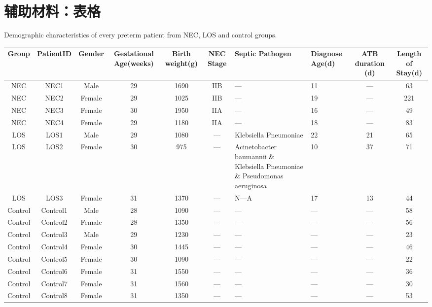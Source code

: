 \chapter{辅助材料：表格}
\label{app:table}
\begin{sidewaystable}[h]
  \tiny
{}
  {Demographic characteristics of every preterm patient from NEC, LOS and control groups.}%
\centering %
\begin{tabular}{ccccccp{2cm}p{2cm}cc} %
\hline\hline %
Group & PatientID & Gender& Gestational Age(weeks) & Birth weight(g) & NEC Stage & Septic Pathogen & Diagnose Age(d) & ATB duration (d) & Length of Stay(d) \\ [0.05ex]
\hline %
NEC & NEC1 & Male & 29 & 1690 & IIB & — & 11 & — & 63 \\
NEC & NEC2 & Female & 29 & 1025 & IIB & — & 19 & — & 221 \\
NEC & NEC3 & Female & 30 & 1950 & IIA & — & 16 & — & 49 \\
NEC & NEC4 & Female & 29 & 1180 & IIA & — & 18 & — & 83 \\
LOS & LOS1 & Male & 29 & 1080 & — & Klebsiella Pneumoniae & 22 & 21 & 65 \\
LOS & LOS2 & Female & 30 & 975 & — & Acinetobacter baumannii \&  Klebsiella Pneumoniae \&  Pseudomonas aeruginosa & 10 & 37 & 71 \\
LOS & LOS3 & Female & 31 & 1370 & — & N—A & 17 & 13 & 44 \\
Control & Control1 & Male & 28 & 1090 & — & — & — & — & 58 \\
Control & Control2 & Female & 28 & 1350 & — & — & — & — & 56 \\
Control & Control3 & Male & 29 & 1230 & — & — & — & — & 23 \\
Control & Control4 & Female & 30 & 1445 & — & — & — & — & 46 \\
Control & Control5 & Female & 30 & 1090 & — & — & — & — & 22  \\
Control & Control6 & Female & 31 & 1550 & — & — & — & — & 36 \\
Control & Control7 & Female & 31 & 1560 & — & — & — & — & 30 \\
Control & Control8 & Female & 31 & 1350 & — & — & — & — & 53 \\

\end{tabular}
\end{sidewaystable}
